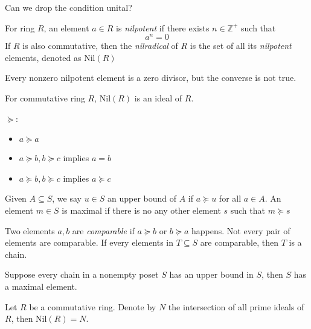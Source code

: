 Can we drop the condition unital?
\begin{definition}[Nilpotent]
For ring $R$, an element $a\in R$ is \emph{nilpotent} if there exists $n\in\mathbb{Z}^+$ such that
\[
a^n=0
\]
If $R$ is also commutative, then the \emph{nilradical} of $R$ is the set of all its \emph{nilpotent} elements, denoted as $\mbox{Nil}(R)$
\end{definition}
\begin{remark}
Every nonzero nilpotent element is a zero divisor, but the converse is not true.
\end{remark}
\begin{proposition}
For commutative ring $R$, $\mbox{Nil}(R)$ is an ideal of $R$.
\end{proposition}
\begin{definition}
$\succeq$:
\begin{itemize}
\item
$a\succeq a$
\item
$a\succeq b,b\succeq c$ implies $a=b$
\item
$a\succeq b,b\succeq c$ implies $a\succeq c$
\end{itemize}
Given $A\subseteq S$, we say $u\in S$ an upper bound of $A$ if $a\succeq u$ for all $a\in A$. An element $m\in S$ is maximal if there is no any other element $s$ such that $m\succeq s$
\end{definition}
\begin{remark}
Two elements $a,b$ are \emph{comparable} if $a\succeq b$ or $b\succeq a$ happens. Not every pair of elements are comparable. If every elements in $T\subseteq S$ are comparable, then $T$ is a chain.
\end{remark}
\begin{proposition}
Suppose every chain in a nonempty poset $S$ has an upper bound in $S$, then $S$ has a maximal element.
\end{proposition}
\begin{theorem}
Let $R$ be a commutative ring. Denote by $N$ the intersection of all prime ideals of $R$, then $\mbox{Nil}(R)=N$.
\end{theorem}
